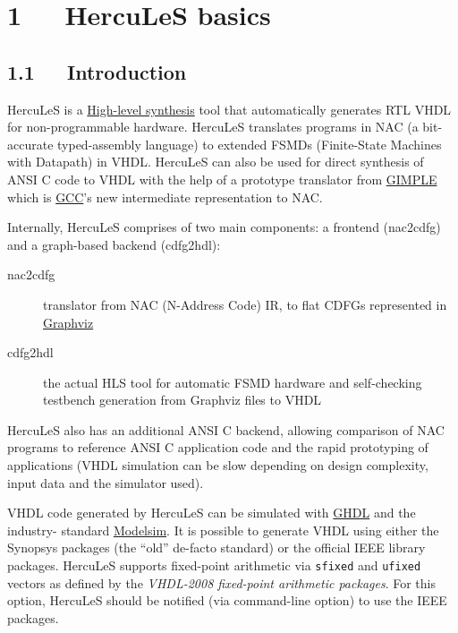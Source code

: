 \documentclass[a4paper]{article}
\providecommand*{\DUroletitlereference}[1]{\textsl{#1}}
\begin{document}
\label{contents}
\tableofcontents



\section{1~~~HercuLeS basics%
  \label{hercules-basics}%
}


\subsection{1.1~~~Introduction%
  \label{introduction}%
}

HercuLeS is a \href{http://en.wikipedia.org/wiki/High-level_synthesis}{High-level synthesis} tool that automatically generates RTL VHDL
for non-programmable hardware. HercuLeS translates programs in NAC (a
bit-accurate typed-assembly language) to extended FSMDs (Finite-State Machines
with Datapath) in VHDL. HercuLeS can also be used for direct synthesis of ANSI C
code to VHDL with the help of a prototype translator from \href{http://gcc.gnu.org/wiki/GIMPLE}{GIMPLE} which is \href{http://gcc.gnu.org}{GCC}'s
new intermediate representation to NAC.

Internally, HercuLeS comprises of two main components: a frontend (nac2cdfg) and
a graph-based backend (cdfg2hdl):
%
\begin{description}
\item[{nac2cdfg}] \leavevmode 
translator from NAC (N-Address Code) IR, to flat CDFGs represented in \href{http://www.graphviz.org}{Graphviz}

\item[{cdfg2hdl}] \leavevmode 
the actual HLS tool for automatic FSMD hardware and self-checking testbench
generation from Graphviz files to VHDL

\end{description}

HercuLeS also has an additional ANSI C backend, allowing comparison of NAC
programs to reference ANSI C application code and the rapid prototyping of
applications (VHDL simulation can be slow depending on design complexity, input
data and the simulator used).

VHDL code generated by HercuLeS can be simulated with \href{http://ghdl.free.fr}{GHDL} and the industry-
standard \href{http://www.model.com}{Modelsim}. It is possible to generate VHDL using either the Synopsys
packages (the ``old'' de-facto standard) or the official IEEE library packages.
HercuLeS supports fixed-point arithmetic via \texttt{sfixed} and \texttt{ufixed}
vectors as defined by the \DUroletitlereference{VHDL-2008 fixed-point arithmetic packages}.
For this option, HercuLeS should be notified (via command-line option) to use
the IEEE packages.
\end{document}
